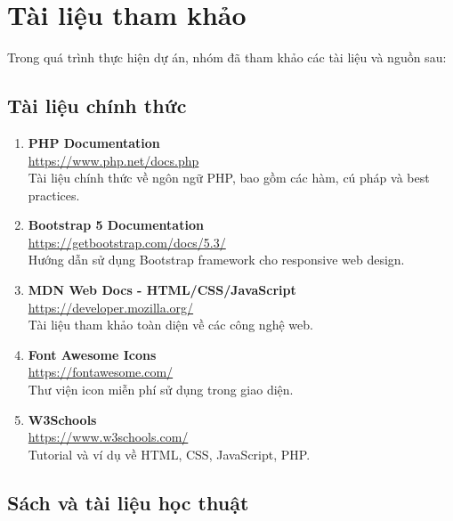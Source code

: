 
\section{Tài liệu tham khảo}

Trong quá trình thực hiện dự án, nhóm đã tham khảo các tài liệu và nguồn sau:

\subsection{Tài liệu chính thức}

\begin{enumerate}
    \item \textbf{PHP Documentation}\\
    \url{https://www.php.net/docs.php}\\
    Tài liệu chính thức về ngôn ngữ PHP, bao gồm các hàm, cú pháp và best practices.
    
    \item \textbf{Bootstrap 5 Documentation}\\
    \url{https://getbootstrap.com/docs/5.3/}\\
    Hướng dẫn sử dụng Bootstrap framework cho responsive web design.
    
    \item \textbf{MDN Web Docs - HTML/CSS/JavaScript}\\
    \url{https://developer.mozilla.org/}\\
    Tài liệu tham khảo toàn diện về các công nghệ web.
    
    \item \textbf{Font Awesome Icons}\\
    \url{https://fontawesome.com/}\\
    Thư viện icon miễn phí sử dụng trong giao diện.
    
    \item \textbf{W3Schools}\\
    \url{https://www.w3schools.com/}\\
    Tutorial và ví dụ về HTML, CSS, JavaScript, PHP.
\end{enumerate}

\subsection{Sách và tài liệu học thuật}

